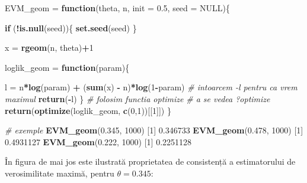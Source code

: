 \documentclass[]{article}
\newenvironment{Shaded}{\begin{snugshade}}{\end{snugshade}}
\newcommand{\KeywordTok}[1]{\textcolor[rgb]{0.13,0.29,0.53}{\textbf{#1}}}
\newcommand{\DataTypeTok}[1]{\textcolor[rgb]{0.13,0.29,0.53}{#1}}
\newcommand{\DecValTok}[1]{\textcolor[rgb]{0.00,0.00,0.81}{#1}}
\newcommand{\FloatTok}[1]{\textcolor[rgb]{0.00,0.00,0.81}{#1}}
\newcommand{\StringTok}[1]{\textcolor[rgb]{0.31,0.60,0.02}{#1}}
\newcommand{\CommentTok}[1]{\textcolor[rgb]{0.56,0.35,0.01}{\textit{#1}}}
\newcommand{\OtherTok}[1]{\textcolor[rgb]{0.56,0.35,0.01}{#1}}
\newcommand{\ControlFlowTok}[1]{\textcolor[rgb]{0.13,0.29,0.53}{\textbf{#1}}}
\newcommand{\OperatorTok}[1]{\textcolor[rgb]{0.81,0.36,0.00}{\textbf{#1}}}
\newcommand{\NormalTok}[1]{#1}
\begin{document}
\begin{Shaded}
\begin{Highlighting}[]
\NormalTok{EVM_geom =}\StringTok{ }\ControlFlowTok{function}\NormalTok{(theta, n, }\DataTypeTok{init =} \FloatTok{0.5}\NormalTok{, }\DataTypeTok{seed =} \OtherTok{NULL}\NormalTok{)\{}
  
  \ControlFlowTok{if}\NormalTok{ (}\OperatorTok{!}\KeywordTok{is.null}\NormalTok{(seed))\{}
    \KeywordTok{set.seed}\NormalTok{(seed)}
\NormalTok{  \}}
  
\NormalTok{  x =}\StringTok{ }\KeywordTok{rgeom}\NormalTok{(n, theta)}\OperatorTok{+}\DecValTok{1}
  
\NormalTok{  loglik_geom =}\StringTok{ }\ControlFlowTok{function}\NormalTok{(param)\{}
    
\NormalTok{    l =}\StringTok{ }\NormalTok{n}\OperatorTok{*}\KeywordTok{log}\NormalTok{(param) }\OperatorTok{+}\StringTok{ }\NormalTok{(}\KeywordTok{sum}\NormalTok{(x) }\OperatorTok{-}\StringTok{ }\NormalTok{n)}\OperatorTok{*}\KeywordTok{log}\NormalTok{(}\DecValTok{1}\OperatorTok{-}\NormalTok{param)}
    \CommentTok{# intoarcem -l pentru ca vrem maximul}
    \KeywordTok{return}\NormalTok{(}\OperatorTok{-}\NormalTok{l)}
\NormalTok{  \}}
  \CommentTok{# folosim functia optimize}
  \CommentTok{# a se vedea ?optimize}
  \KeywordTok{return}\NormalTok{(}\KeywordTok{optimize}\NormalTok{(loglik_geom, }\KeywordTok{c}\NormalTok{(}\DecValTok{0}\NormalTok{,}\DecValTok{1}\NormalTok{))[[}\DecValTok{1}\NormalTok{]])}
\NormalTok{\}}

\CommentTok{# exemple}
\KeywordTok{EVM_geom}\NormalTok{(}\FloatTok{0.345}\NormalTok{, }\DecValTok{1000}\NormalTok{)}
\NormalTok{[}\DecValTok{1}\NormalTok{] }\FloatTok{0.346733}
\KeywordTok{EVM_geom}\NormalTok{(}\FloatTok{0.478}\NormalTok{, }\DecValTok{1000}\NormalTok{)}
\NormalTok{[}\DecValTok{1}\NormalTok{] }\FloatTok{0.4931127}
\KeywordTok{EVM_geom}\NormalTok{(}\FloatTok{0.222}\NormalTok{, }\DecValTok{1000}\NormalTok{)}
\NormalTok{[}\DecValTok{1}\NormalTok{] }\FloatTok{0.2251128}
\end{Highlighting}
\end{Shaded}

În figura de mai jos este ilustrată proprietatea de consistență a
estimatorului de verosimilitate maximă, pentru \(\theta = 0.345\):
\end{document}
